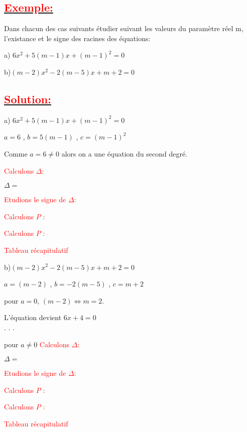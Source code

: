 \documentclass[12pt]{article}
\begin{document}
\subsection*{\underline{\textbf{\textcolor{red}{Exemple:}}}}
Dans chacun des cas suivants étudier suivant les valeurs du paramètre réel m, l'existance et le signe des racines des équations:

a)
$6x^{2}+5(m-1)x+(m-1)^{2}=0$

b)$(m-2)x^{2}-2(m-5)x+m+2=0$
\subsection*{\underline{\textbf{\textcolor{red}{Solution:}}}}
a)
$6x^{2}+5(m-1)x+(m-1)^{2}=0$

$a=6$ , $b=5(m-1)$ , $c=(m-1)^{2}$

Comme $a=6\neq 0$ alors on a une équation du second degré.

\textcolor{red}{Calculons $\Delta$:}

$\Delta=$

\textcolor{red}{Etudions le signe de $\Delta$:}

\textcolor{red}{Calculons $P$ :}

\textcolor{red}{Calculons $P$ :}

\textcolor{red}{Tableau récapitulatif}

b)$(m-2)x^{2}-2(m-5)x+m+2=0$

$a=(m-2)$ , $b=-2(m-5)$ , $c=m+2$

pour $a=0$, $(m-2) \Leftrightarrow m=2$.

L'équation devient $6x+4=0$\\
.
.
.

pour $a\neq 0$
\textcolor{red}{Calculons $\Delta$:}

$\Delta=$

\textcolor{red}{Etudions le signe de $\Delta$:}

\textcolor{red}{Calculons $P$ :}

\textcolor{red}{Calculons $P$ :}

\textcolor{red}{Tableau récapitulatif}
\end{document}

